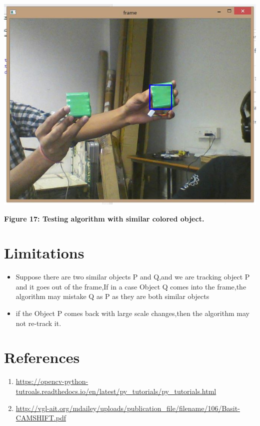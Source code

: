 \documentclass[11pt,a4paper]{article}
\begin{document}
	 \begin{center}
	 	\includegraphics[scale=0.8]{test.JPG}
	 \end{center}
	 \begin{center}
	 	\textbf{Figure 17: Testing algorithm with similar colored object.}
	 \end{center}
	 \section{Limitations}
		 \begin{itemize}
		 
		 \item Suppose there are two similar objects P and Q,and we are tracking object P
and it goes out of the frame,If in a case Object Q comes into the frame,the algorithm may mistake Q as P as they are both similar objects 
\item if the Object P comes back with large scale changes,then the algorithm may not re-track it.
		  \end{itemize}
	 \newpage
	\section{References}
	\begin{enumerate}
			\item \url{https://opencv-python-tutroals.readthedocs.io/en/latest/py_tutorials/py_tutorials.html}

\item \url{http://vgl-ait.org/mdailey/uploads/publication_file/filename/106/Basit-CAMSHIFT.pdf}
   \end{enumerate}
	
\end{document}
